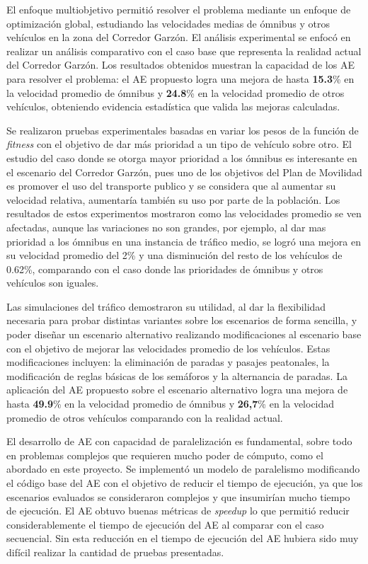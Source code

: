 El enfoque multiobjetivo permitió resolver el problema mediante un enfoque de optimización global, estudiando las velocidades medias de ómnibus y otros vehículos en la zona del Corredor Garzón. El análisis experimental se enfocó en realizar un análisis comparativo con el caso base que representa la realidad actual del Corredor Garzón. Los resultados obtenidos muestran la capacidad de los AE para resolver el problema: el AE propuesto logra una mejora de hasta \textbf{15.3}\% en la velocidad promedio de ómnibus y \textbf{24.8}\% en la velocidad promedio de otros vehículos, obteniendo evidencia estadística que valida las mejoras calculadas.

Se realizaron pruebas experimentales basadas en variar los pesos de la función de \emph{fitness} con el objetivo de dar más prioridad a un tipo de vehículo sobre otro. El estudio del caso donde se otorga mayor prioridad a los ómnibus es interesante en el escenario del Corredor Garzón, pues uno de los objetivos del Plan de Movilidad es promover el uso del transporte publico y se considera que al aumentar su velocidad relativa, aumentaría también su uso por parte de la población. Los resultados de estos experimentos mostraron como las velocidades promedio se ven afectadas, aunque las variaciones no son grandes, por ejemplo, al dar mas prioridad a los ómnibus en una instancia de tráfico medio, se logró una mejora en su velocidad promedio del 2\% y una disminución del resto de los vehículos de 0.62\%, comparando con el caso donde las prioridades de ómnibus y otros vehículos son iguales.

Las simulaciones del tráfico demostraron su utilidad, al dar la flexibilidad necesaria para probar distintas variantes sobre los escenarios de forma sencilla, y poder diseñar un escenario alternativo realizando modificaciones al escenario base con el objetivo de mejorar las velocidades promedio de los vehículos. Estas modificaciones incluyen: la eliminación de paradas y pasajes peatonales, la modificación de reglas básicas de los semáforos y la alternancia de paradas. La aplicación del AE propuesto sobre el escenario alternativo logra una mejora de hasta \textbf{49.9}\% en la velocidad promedio de ómnibus y \textbf{26,7}\% en la velocidad promedio de otros vehículos comparando con la realidad actual.

El desarrollo de AE con capacidad de paralelización es fundamental, sobre todo en problemas complejos que requieren mucho poder de cómputo, como el abordado en este proyecto. Se implementó un modelo de paralelismo modificando el código base del AE con el objetivo de reducir el tiempo de ejecución, ya que los escenarios evaluados se consideraron complejos y que insumirían mucho tiempo de ejecución. El AE obtuvo buenas métricas de \emph{speedup} lo que permitió reducir considerablemente el tiempo de ejecución del AE al comparar con el caso secuencial. Sin esta reducción en el tiempo de ejecución del AE hubiera sido muy difícil realizar la cantidad de pruebas presentadas.

